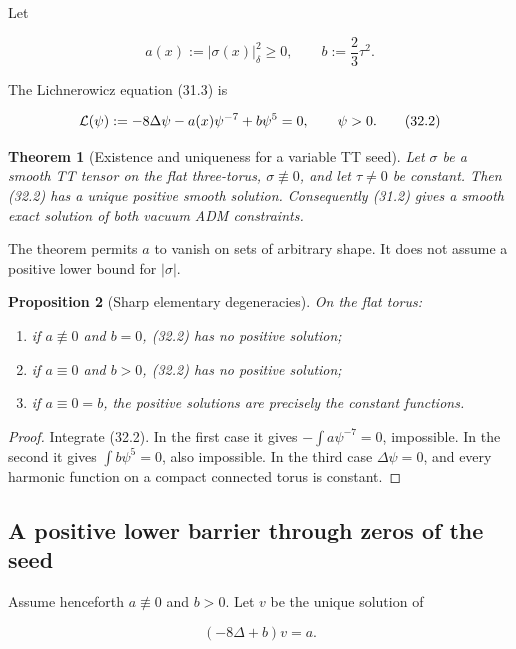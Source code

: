\documentclass[11pt]{article}
\newtheorem{theorem}{Theorem}[section]
\newtheorem{proposition}[theorem]{Proposition}
\theoremstyle{remark}
\begin{document}
Let

\[
 a(x):=|\sigma(x)|_\delta^2\geq0,\qquad
 b:=\frac23\tau^2.                                            \tag{32.1}
\]

The Lichnerowicz equation (31.3) is

\[
 {\cal L}(\psi):=-8\Delta\psi-a(x)\psi^{-7}+b\psi^5=0,
 \qquad \psi>0.                                                \tag{32.2}
\]

\begin{theorem}[Existence and uniqueness for a variable TT seed]
\label{thm:v19v29-existence}
Let \(\sigma\) be a smooth TT tensor on the flat three-torus,
\(\sigma\not\equiv0\), and let \(\tau\neq0\) be constant.  Then (32.2)
has a unique positive smooth solution.  Consequently (31.2) gives a
smooth exact solution of both vacuum ADM constraints.
\end{theorem}

The theorem permits \(a\) to vanish on sets of arbitrary shape.  It does
not assume a positive lower bound for \(|\sigma|\).

\begin{proposition}[Sharp elementary degeneracies]
\label{prop:v19v29-degenerate}
On the flat torus:
\begin{enumerate}
\item if \(a\not\equiv0\) and \(b=0\), (32.2) has no positive solution;
\item if \(a\equiv0\) and \(b>0\), (32.2) has no positive solution;
\item if \(a\equiv0=b\), the positive solutions are precisely the
constant functions.
\end{enumerate}
\end{proposition}

\begin{proof}
Integrate (32.2).  In the first case it gives
\(-\int a\psi^{-7}=0\), impossible.  In the second it gives
\(\int b\psi^5=0\), also impossible.  In the third case
\(\Delta\psi=0\), and every harmonic function on a compact connected
torus is constant.
\end{proof}

\subsection{A positive lower barrier through zeros of the seed}

Assume henceforth \(a\not\equiv0\) and \(b>0\).  Let \(v\) be the unique
solution of

\[
 (-8\Delta+b)v=a.                                             \tag{32.3}
\]
\end{document}
